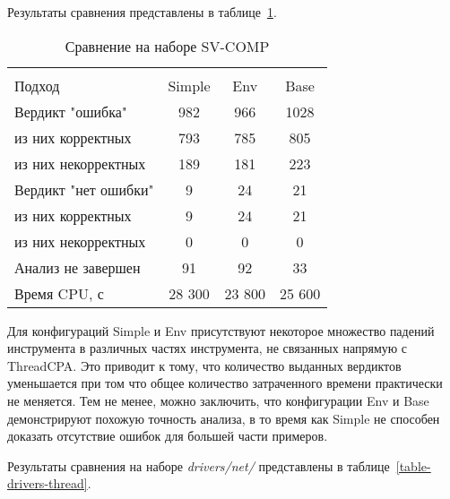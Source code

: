 Результаты сравнения представлены в таблице~\ref{table-svcomp-thread}.

  \begin{table}[h]\footnotesize \centering
    \caption{Сравнение на наборе SV-COMP}
  	\label{table-svcomp-thread}
    \begin{tabular}{ | l | c | c | c | }
      \hline
      		& 		\multicolumn{3}{c|}{\theory}  \\
      Подход         				& Simple   	& Env 		& Base  	\\ \hline
      Вердикт "ошибка" 				& 982    	& 966       & 1028       \\ 
  \hspace{0.5cm} из них корректных 	& 793 		& 785 		& 805    	\\ 
  \hspace{0.5cm} из них некорректных & 189 		& 181 		& 223     	\\ \hline
      Вердикт "нет ошибки"  		& 9      	& 24        & 21       	\\ 
  \hspace{0.5cm} из них корректных 	& 9 		& 24    	& 21      	\\
  \hspace{0.5cm} из них некорректных & 0 		& 0    		& 0     	\\ \hline
      Анализ не завершен       		& 91     	& 92        & 33    	\\ \hline
      Время CPU, с   				& 28 300 	& 23 800    & 25 600  	\\
      \hline
    \end{tabular}
  \end{table}

Для конфигураций Simple и Env присутствуют некоторое множество падений инструмента в различных частях инструмента, не связанных напрямую с ThreadCPA.
Это приводит к тому, что количество выданных вердиктов уменьшается при том что общее количество затраченного времени практически не меняется.
Тем не менее, можно заключить, что конфигурации Env и Base демонстрируют похожую точность анализа, в то время как Simple не способен доказать отсутствие ошибок для большей части примеров.

Результаты сравнения на наборе \textit{drivers/net/} представлены в таблице~\ref{table-drivers-thread}.

